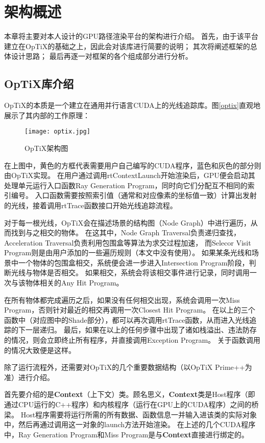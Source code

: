 \chapter{架构概述}
\label{cha:pipeline}

本章将主要对本人设计的GPU路径渲染平台的架构进行介绍。
首先，由于该平台建立在OpTiX的基础之上，因此会对该库进行简要的说明；
其次将阐述框架的总体设计思路；
最后再逐一对框架的各个组成部分进行分析。

\section{OpTiX库介绍}

OpTiX的本质是一个建立在通用并行语言CUDA上的光线追踪库。图\ref{optix}直观地展示了其内部的工作原理：

\begin{figure}[h]
    \centering
    \texttt{[image: optix.jpg]}
    \caption{OpTiX架构图}
    \label{tab:optix}
\end{figure}

在上图中，黄色的方框代表需要用户自己编写的CUDA程序，蓝色和灰色的部分则由OpTiX实现。
在用户通过调用rtContextLaunch开始渲染后，GPU便会启动其处理单元运行入口函数Ray Generation Program，同时向它们分配互不相同的索引编号。
入口函数需要按照索引值（通常和对应像素的坐标值一致）计算出发射的光线，接着调用rtTrace函数接口开始光线追踪流程。

对于每一根光线，OpTiX会在描述场景的结构图（Node Graph）中进行遍历，从而找到与之相交的物体。
在这其中，Node Graph Traversal负责递归查找，Acceleration Traversal负责利用包围盒等算法为求交过程加速，
而Selecor Visit Program则是由用户添加的一些遍历规则（本文中没有使用）。
如果某条光线和场景中一个物体的包围盒相交，系统便会进一步进入Intersection Program阶段，判断光线与物体是否相交。
如果相交，系统会将该相交事件进行记录，同时调用一次与该物体相关的Any Hit Program。

在所有物体都完成遍历之后，如果没有任何相交出现，系统会调用一次Miss Program，否则针对最近的相交再调用一次Closest Hit Program。
在以上的三个函数中（对应图中的Shade部分），都可以再次调用rtTrace函数，从而进入光线追踪的下一层递归。
最后，如果在以上的任何步骤中出现了诸如栈溢出、违法防存的情况，则会立即终止所有程序，并直接调用Exception Program。
关于函数调用的情况大致便是这样。

除了运行流程外，还需要对OpTiX的几个重要数据结构（以OpTiX Prime++为准）进行介绍。

首先要介绍的是\textbf{Context}（上下文）类。顾名思义，\textbf{Context}类是Host程序（即通过CPU运行的C++程序）和内核程序（运行在GPU上的CUDA程序）之间的桥梁。
Host程序需要将运行所需的所有数据、函数信息一并输入进该类的实际对象中，然后再通过调用这一对象的launch方法开始渲染。
在上述的几个CUDA程序中，Ray Generation Program和Miss Program是与\textbf{Context}直接进行绑定的。

